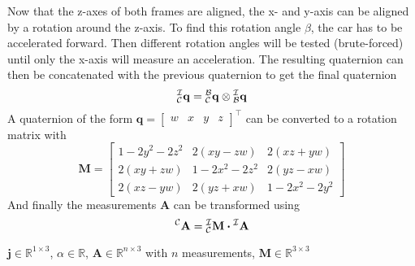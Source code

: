 Now that the z-axes of both frames are aligned, the x- and y-axis can be aligned by a rotation around the z-axis.
To find this rotation angle $\beta$, the car has to be accelerated forward.
Then different rotation angles will be tested (brute-forced) until only the x-axis will measure an acceleration.
The resulting quaternion  can then be concatenated with the previous quaternion to get the final quaternion
\begin{equation}
    \qtf{i}{c} = \qtf{b}{c} \otimes  \qtf{i}{b}
\end{equation}
A quaternion of the form
$\mathbf{q} = \left[\begin{array}{llll} w & x & y & z \end{array}\right]^{\top}$
can be converted to a rotation matrix with
\begin{equation}
    \mathbf{M} =
    \left[
        \begin{array}{ccc}
            1-2 y^{2}-2 z^{2} & 2(x y-z w) & 2(x z+y w) \\
            2(x y+z w) & 1-2 x^{2}-2 z^{2} & 2(y z-x w) \\
            2(x z-y w) & 2(y z+x w) & 1-2 x^{2}-2 y^{2}
        \end{array}
        \right]
    \end{equation}
And finally the measurements $\mathbf{A}$ can be transformed using
\begin{equation}
    \vincs{A}{c} = \mtf{i}{c} \vdot \vincs{A}{i}
\end{equation}

$\mathbf{j} \in \mathbb{R}^{1\times3}$, $\alpha \in \mathbb{R}$, $\mathbf{A} \in \mathbb{R}^{n\times3}$ with $n$ measurements, $\mathbf{M} \in \mathbb{R}^{3\times3}$


